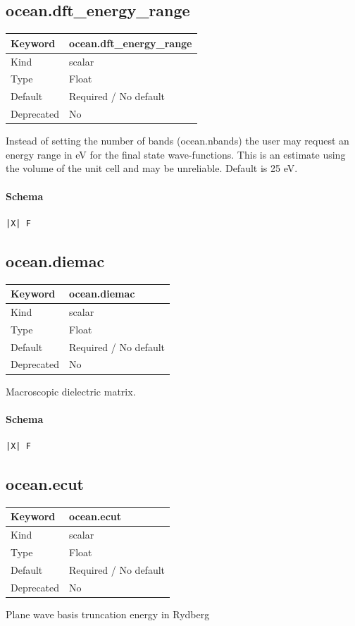 \documentclass[11pt]{article}
\begin{document}
{{{{{\subsection{ocean.dft\_energy\_range}
\label{kw:ocean-dft-energy-range}
\begin{longtable}{|p{1.5in}|p{4.5in}|}
\hline
Keyword & ocean.dft\_energy\_range \\
\hline
Kind & scalar \\
\hline
Type & Float \\
\hline
Default & Required / No default \\
\hline
Deprecated & No \\
\hline
\end{longtable}
 Instead of setting the number of bands (ocean.nbands) the user may request
 an energy range in eV for the final state wave-functions. This is an estimate
 using the volume of the unit cell and may be unreliable. Default is 25 eV.

\paragraph{Schema}
\begin{Verbatim}
|X| F
\end{Verbatim}

\subsection{ocean.diemac}
\label{kw:ocean-diemac}
\begin{longtable}{|p{1.5in}|p{4.5in}|}
\hline
Keyword & ocean.diemac \\
\hline
Kind & scalar \\
\hline
Type & Float \\
\hline
Default & Required / No default \\
\hline
Deprecated & No \\
\hline
\end{longtable}
 Macroscopic dielectric matrix.

\paragraph{Schema}
\begin{Verbatim}
|X| F
\end{Verbatim}

\subsection{ocean.ecut}
\label{kw:ocean-ecut}
\begin{longtable}{|p{1.5in}|p{4.5in}|}
\hline
Keyword & ocean.ecut \\
\hline
Kind & scalar \\
\hline
Type & Float \\
\hline
Default & Required / No default \\
\hline
Deprecated & No \\
\hline
\end{longtable}
 Plane wave basis truncation energy in Rydberg

}}}}}
\end{document}
